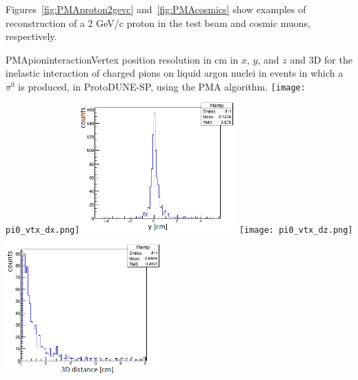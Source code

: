 Figures~\ref{fig:PMAproton2gevc}
and~\ref{fig:PMAcosmics} show examples of reconstruction of a 2 GeV/c proton in the test beam and
cosmic muons, respectively.

\begin{cdrfigure}{PMApioninteraction}{Vertex position resolution in cm in $x$, $y$, and $z$ and 3D for the
  inelastic interaction of charged pions on liquid argon nuclei in events in which a $\pi^0$ is produced, in
  ProtoDUNE-SP, using the PMA algorithm.}
\texttt{[image: pi0\_vtx\_dx.png]}\includegraphics[width=0.45\textwidth]{figures/pi0_vtx_dy.png}
\texttt{[image: pi0\_vtx\_dz.png]}\includegraphics[width=0.45\textwidth]{figures/pi0_vtx3d.png}
\end{cdrfigure}


